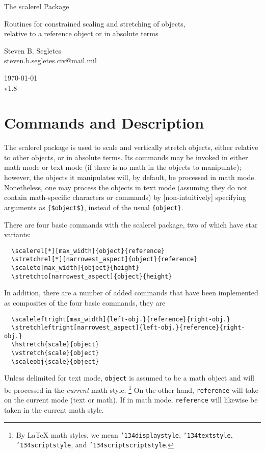 \documentclass{article}
\def\version{1.8}
\let\vb\verb
\newcommand\cmd[1]{\texttt{\char'134#1}}
\begin{document}
\begin{center}
\LARGE The \textsf{scalerel} Package\\
\rule{0em}{.7em}\small Routines for constrained scaling and stretching
of objects,\\relative to a reference object or in absolute terms\\
\rule{0em}{2.7em}\large Steven B. Segletes\\
steven.b.segletes.civ@mail.mil\\
\rule{0em}{1.7em}\today\\
v\version
\end{center}

\section{Commands and Description}

The \textsf{scalerel} package is used to scale and vertically stretch
  objects, either relative to other objects, or in absolute terms.  
Its commands may be invoked in either math mode or text mode (if there 
  is no math in the objects to manipulate); 
however, the objects it manipulates will, by default, be processed in 
  math mode.  
Nonetheless, one may process the objects in text mode (assuming they 
  do not contain math-specific characters or commands) by 
  [non-intuitively] specifying arguments as \vb|{$object$}|, instead
  of the usual \vb|{object}|.

There are four basic commands with the \textsf{scalerel} package, two
of which have star variants:
\begin{verbatim}
  \scalerel[*][max_width]{object}{reference}
  \stretchrel[*][narrowest_aspect]{object}{reference}
  \scaleto[max_width]{object}{height}
  \stretchto[narrowest_aspect]{object}{height}
\end{verbatim} 
In addition, there are a number of added commands that have been
implemented as composites of the four basic commands, they are
\begin{verbatim}
  \scaleleftright[max_width]{left-obj.}{reference}{right-obj.}
  \stretchleftright[narrowest_aspect]{left-obj.}{reference}{right-obj.}
  \hstretch{scale}{object}
  \vstretch{scale}{object}
  \scaleobj{scale}{object}
\end{verbatim}
Unless delimited for text mode, \texttt{object} is assumed to be a math
  object and will be processed in the \textit{current} math style.%
\footnote{By \LaTeX{} math styles, we mean \cmd{displaystyle}, \cmd{textstyle},
  \cmd{scriptstyle}, and \cmd{scriptscriptstyle}.}
On the other hand, \texttt{reference} will take on the current mode (text
  or math).  
If in math mode, \texttt{reference} will likewise be taken in the current
  math style.
\end{document}
